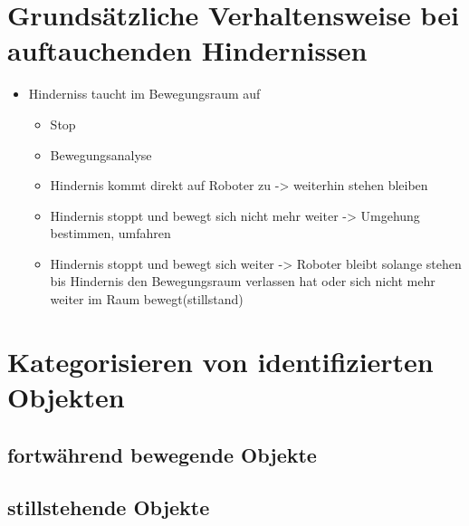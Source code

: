 		\section{Grundsätzliche Verhaltensweise bei auftauchenden Hindernissen}
		\begin{itemize}
		\item Hinderniss taucht im Bewegungsraum auf
			\begin{itemize}
				\item Stop
				\item Bewegungsanalyse
				\item Hindernis kommt direkt auf Roboter zu -> weiterhin stehen bleiben
				\item Hindernis stoppt und bewegt sich nicht mehr weiter -> Umgehung bestimmen, umfahren
				\item Hindernis stoppt und bewegt sich weiter -> Roboter bleibt solange stehen bis Hindernis den Bewegungsraum verlassen hat oder sich nicht mehr weiter im Raum bewegt(stillstand) 
			\end{itemize}
		\end{itemize}
		\section{Kategorisieren von identifizierten Objekten}
			\subsection{fortwährend bewegende Objekte}
			\subsection{stillstehende Objekte}